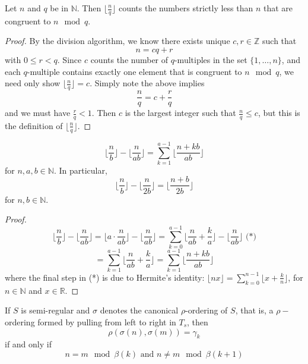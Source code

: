 \begin{lemma}
Let $n$ and $q$ be in $\mathbb{N}$. Then $\lfloor\frac{n}{q} \rfloor$ counts the numbers strictly less than $n$ that are congruent to $n \mod q$.
\end{lemma}

\begin{proof}
By the division algorithm, we know there exists unique $c,r \in \mathbb{Z}$ such that \[n = cq + r\] with $0 \leq r < q$. Since $c$ counts the number of $q$-multiples in the set $\{1,\ldots,n\}$, and each $q$-multiple contains exactly one element that is congruent to $n \mod q$, we need only show $\lfloor\frac{n}{q} \rfloor = c$. Simply note the above implies  \[\frac{n}{q} = c + \frac{r}{q}\] and we must have   $\frac{r}{q} < 1$. Then $c$ is the largest integer such that $\frac{n}{q} \leq c$, but this is the definition of $\lfloor\frac{n}{q} \rfloor$.
\end{proof}


\begin{lemma}
\label{semi-regular formula}
\[\lfloor\frac{n}{b} \rfloor - \lfloor \frac{n}{ab} \rfloor = \sum_{k=1}^{a-1} \lfloor \frac{n + kb}{ab} \rfloor\] for $n,a,b \in \mathbb{N}$. In particular, 
\[\lfloor\frac{n}{b} \rfloor - \lfloor \frac{n}{2b} \rfloor= \lfloor \frac{n+b}{2b} \rfloor\] for  $n,b \in \mathbb{N}$.
\end{lemma}

\begin{proof}
\[\lfloor\frac{n}{b} \rfloor - \lfloor \frac{n}{ab} \rfloor = \lfloor a \cdot \frac{n}{ab} \rfloor - \lfloor \frac{n}{ab} \rfloor  = \sum_{k=0}^{a-1} \lfloor \frac{n}{ab} + \frac{k}{a} \rfloor - \lfloor \frac{n}{ab} \rfloor \text{ (*)}\]
\[= \sum_{k=1}^{a-1} \lfloor \frac{n}{ab} + \frac{k}{a} \rfloor = \sum_{k=1}^{a-1} \lfloor \frac{n + kb}{ab} \rfloor \]
where the final step in (*) is due to Hermite's identity: $\lfloor nx \rfloor = \sum_{k=0}^{n-1} \lfloor x + \frac{k}{n} \rfloor$, for $n \in \mathbb{N}$ and $x \in \mathbb{R}$.
\end{proof}                                                                                                              

\begin{lemma}
If $S$ is semi-regular and $\sigma$ denotes the canonical $\rho$-ordering of $S$, that is, a $\rho-$ordering formed by pulling from left to right in $T_s$, then \[\rho(\sigma(n),\sigma(m))=\gamma_k\] if and only if \[ n=m \mod \beta(k) \text{  and } n \neq m \mod \beta(k+1)\]
\end{lemma}

